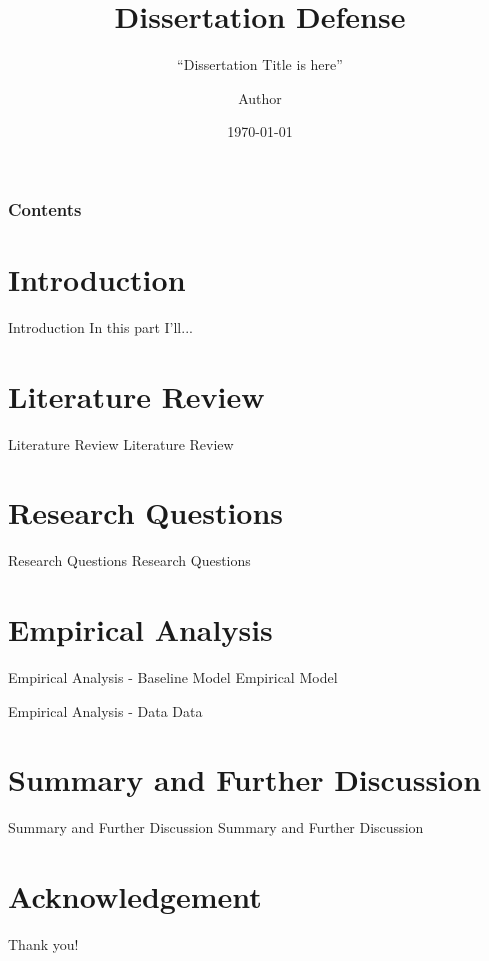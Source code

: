 \documentclass[10pt]{beamer}
\title{Dissertation Defense}
\subtitle{ ``Dissertation Title is here”}  %
\author{Author} %
\institute{Claremont Graduate University}
\date[\textcolor{white}{\today}]  %
{\today}
\begin{document}
\frame{\titlepage}
\begin{frame}
\frametitle{Contents}
\tableofcontents
\end{frame}
\section{Introduction}
    \begin{frame}{Introduction}
 In this part I'll...
    \end{frame}

\section{Literature Review}
    \begin{frame}{Literature Review}
	Literature Review
    \end{frame}


\section{Research Questions}
    \begin{frame}{Research Questions}
        Research Questions
    \end{frame}


\section{Empirical Analysis}
    \begin{frame}{Empirical Analysis - Baseline Model}
	Empirical Model
    \end{frame}

    \begin{frame}{Empirical Analysis - Data}
	Data
    \end{frame}


\section{Summary and Further Discussion}
    \begin{frame}{Summary and Further Discussion}
	Summary and Further Discussion
    \end{frame}

\section*{Acknowledgement}  
\begin{frame}
\textcolor{myNewColorA}{\Huge{\centerline{Thank you!}}}
\end{frame}
\end{document}

